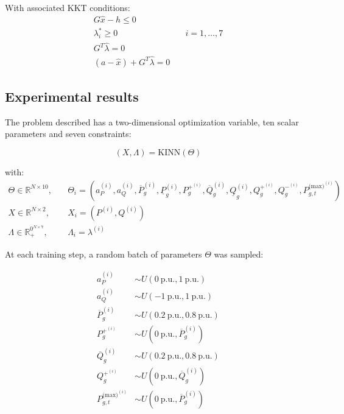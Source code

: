 \documentclass[
]{article}
\begin{document}
With associated KKT conditions: \begin{align}
    G\hat{x} - h \leq 0&\\
    \lambda_i^* \geq 0& \quad i=1,\dots, 7\\
    G^T\hat\lambda = 0&\\
    (a-\hat{x}) + G^T\hat\lambda  = 0 &
\end{align}

\subsection{Experimental results}\label{experimental-results}

The problem described has a two-dimensional optimization variable, ten
scalar parameters and seven constraints:

\begin{equation}
 (X, \Lambda) = \mathrm{KINN}(\Theta)
\end{equation}

with: \begin{align}
\Theta \in \mathbb{R}^{N \times 10}, \quad&\Theta_{i} = (a_P^{(i)}, a_Q^{(i)},\overline{P}_g^{(i)}, \underline{P}_g^{(i)}, P_g^{+^{(i)}}, \overline{Q}_g^{(i)}, \underline{Q}_g^{(i)}, Q_g^{+^{(i)}}, Q_g^{-^{(i)}}, P^{\textrm{(max)}^{(i)}}_{g,t})\\
X \in \mathbb{R}^{N \times 2}, \quad&X_{i} = (P^{(i)}, Q^{(i)})\\
\Lambda \in \mathbb{R}_+^{0^{N \times 7}}, \quad&\Lambda_{i} = \lambda^{(i)}
\end{align}

At each training step, a random batch of parameters \(\Theta\) was
sampled:

\begin{align}
a_P^{(i)} &\sim U(0~\mathrm{p.u}., 1~\mathrm{p.u.})\\
a_Q^{(i)} &\sim U(-1~\mathrm{p.u}., 1~\mathrm{p.u.})\\
\overline{P}_g^{(i)} &\sim U(0.2~\mathrm{p.u}., 0.8~\mathrm{p.u.})\\
P_g^{+^{(i)}} &\sim U(0~\mathrm{p.u}., \overline{P}_g^{(i)})\\
\overline{Q}_g^{(i)} &\sim U(0.2~\mathrm{p.u}., 0.8~\mathrm{p.u.})\\
Q_g^{+^{(i)}} &\sim U(0~\mathrm{p.u}., \overline{Q}_g^{(i)})\\
P^{\textrm{(max)}^{(i)}}_{g,t} &\sim U(0~\mathrm{p.u}., \overline{P}_g^{(i)})
\end{align}
\end{document}
